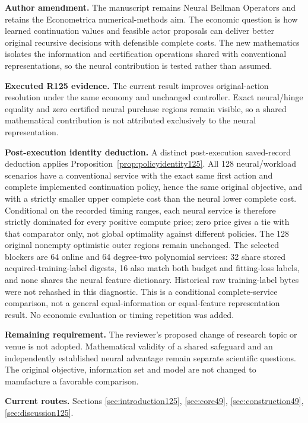 \noindent\textbf{Author amendment.} The manuscript remains Neural Bellman Operators and retains the Econometrica numerical-methods aim. The economic question is how learned continuation values and feasible actor proposals can deliver better original recursive decisions with defensible complete costs. The new mathematics isolates the information and certification operations shared with conventional representations, so the neural contribution is tested rather than assumed.

\noindent\textbf{Executed R125 evidence.} The current result improves original-action resolution under the same economy and unchanged controller. Exact neural/hinge equality and zero certified neural purchase regions remain visible, so a shared mathematical contribution is not attributed exclusively to the neural representation.

\noindent\textbf{Post-execution identity deduction.} A distinct post-execution saved-record deduction applies Proposition~\ref{prop:policyidentity125}. All 128 neural/workload scenarios have a conventional service with the exact same first action and complete implemented continuation policy, hence the same original objective, and with a strictly smaller upper complete cost than the neural lower complete cost. Conditional on the recorded timing ranges, each neural service is therefore strictly dominated for every positive compute price; zero price gives a tie with that comparator only, not global optimality against different policies. The 128 original nonempty optimistic outer regions remain unchanged. The selected blockers are 64 online and 64 degree-two polynomial services: 32 share stored acquired-training-label digests, 16 also match both budget and fitting-loss labels, and none shares the neural feature dictionary. Historical raw training-label bytes were not rehashed in this diagnostic. This is a conditional complete-service comparison, not a general equal-information or equal-feature representation result. No economic evaluation or timing repetition was added.

\noindent\textbf{Remaining requirement.} The reviewer's proposed change of research topic or venue is not adopted. Mathematical validity of a shared safeguard and an independently established neural advantage remain separate scientific questions. The original objective, information set and model are not changed to manufacture a favorable comparison.

\noindent\textbf{Current routes.} Sections \ref{sec:introduction125}, \ref{sec:core49}, \ref{sec:construction49}, \ref{sec:discussion125}.

